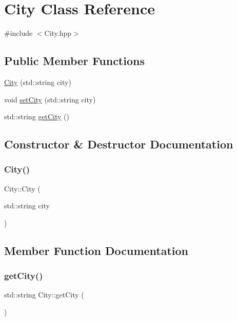 \hypertarget{class_city}{}\section{City Class Reference}
\label{class_city}


{\ttfamily \#include $<$City.\+hpp$>$}

\subsection*{Public Member Functions}
\begin{DoxyCompactItemize}
\item 
\mbox{\hyperlink{class_city_adf38f4f0d2af6077f08df3303be0e926}{City}} (std\+::string city)
\item 
void \mbox{\hyperlink{class_city_a9f2a2f59076c2ec2591d3713e8ee29c5}{set\+City}} (std\+::string city)
\item 
std\+::string \mbox{\hyperlink{class_city_a6c7e39be8514b529f011a2f220e4de0e}{get\+City}} ()
\end{DoxyCompactItemize}


\subsection{Constructor \& Destructor Documentation}
\mbox{\label{class_city_adf38f4f0d2af6077f08df3303be0e926}} 
\subsubsection{\texorpdfstring{City()}{City()}}
{\footnotesize\ttfamily City\+::\+City (\begin{DoxyParamCaption}\item[{std\+::string}]{city }\end{DoxyParamCaption})}



\subsection{Member Function Documentation}
\mbox{\label{class_city_a6c7e39be8514b529f011a2f220e4de0e}} 
\subsubsection{\texorpdfstring{getCity()}{getCity()}}
{\footnotesize\ttfamily std\+::string City\+::get\+City (\begin{DoxyParamCaption}{ }\end{DoxyParamCaption})}

